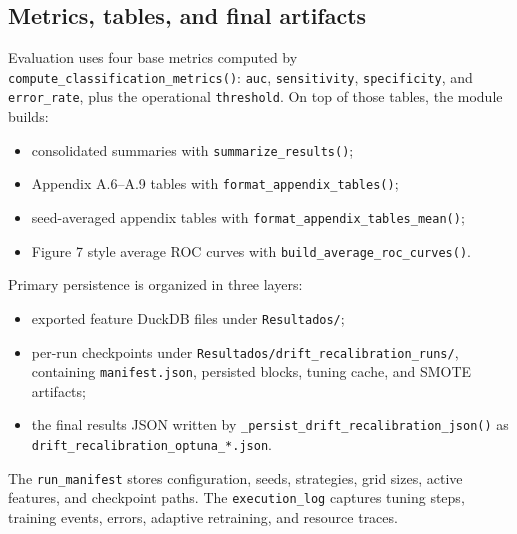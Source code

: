 \subsection{Metrics, tables, and final artifacts}
Evaluation uses four base metrics computed by \texttt{compute\_classification\_metrics()}: \texttt{auc}, \texttt{sensitivity}, \texttt{specificity}, and \texttt{error\_rate}, plus the operational \texttt{threshold}. On top of those tables, the module builds:
\begin{itemize}[leftmargin=*]
  \item consolidated summaries with \texttt{summarize\_results()};
  \item Appendix A.6--A.9 tables with \texttt{format\_appendix\_tables()};
  \item seed-averaged appendix tables with \texttt{format\_appendix\_tables\_mean()};
  \item Figure 7 style average ROC curves with \texttt{build\_average\_roc\_curves()}.
\end{itemize}

Primary persistence is organized in three layers:
\begin{itemize}[leftmargin=*]
  \item exported feature DuckDB files under \texttt{Resultados/};
  \item per-run checkpoints under \texttt{Resultados/drift\_recalibration\_runs/}, containing \texttt{manifest.json}, persisted blocks, tuning cache, and SMOTE artifacts;
  \item the final results JSON written by \texttt{\_persist\_drift\_recalibration\_json()} as \texttt{drift\_recalibration\_optuna\_*.json}.
\end{itemize}

The \texttt{run\_manifest} stores configuration, seeds, strategies, grid sizes, active features, and checkpoint paths. The \texttt{execution\_log} captures tuning steps, training events, errors, adaptive retraining, and resource traces.

